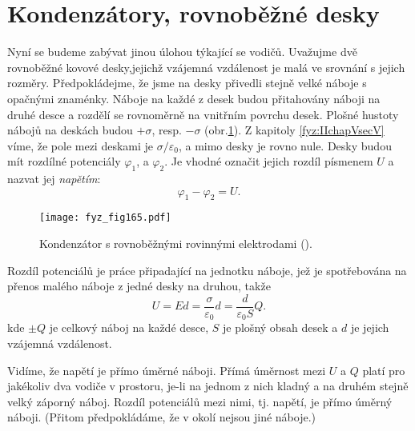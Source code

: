 {\section{Kondenzátory, rovnoběžné desky}\label{fyz:IIchapVsecXIX}
  Nyní se budeme zabývat jinou úlohou týkající se vodičů. Uvažujme dvě rovnoběžné kovové 
  desky,jejichž vzájemná vzdálenost je malá ve srovnání s jejich rozměry. Předpokládejme, že jsme
  na desky přivedli stejně velké náboje s opačnými znaménky. Náboje na každé z desek budou 
  přitahovány náboji na druhé desce a rozdělí se rovnoměrně na vnitřním povrchu desek. Plošné
  hustoty nábojů na deskách budou \(+\sigma\), resp. \(-\sigma\) (obr.\ref{fyz:fig165}). Z kapitoly 
  \ref{fyz:IIchapVsecV} víme, že pole mezi deskami je \(\sigma/\varepsilon_0\), a mimo desky je 
  rovno nule. Desky budou mít rozdílné potenciály \(\varphi_1\), a \(\varphi_2\). Je vhodné označit 
  jejich rozdíl písmenem \(U\) a nazvat jej \emph{napětím}:
  \begin{equation}\label{fyz:eq292}
    \varphi_1 - \varphi_2 = U.
  \end{equation}
  
  \begin{figure}[ht!]  %
    \centering
    \texttt{[image: fyz\_fig165.pdf]}
    \caption{Kondenzátor s rovnoběžnými rovinnými elektrodami 
             (\cite[s.~114]{Feynman02}).}
    \label{fyz:fig165}
  \end{figure}
  
  Rozdíl potenciálů je práce připadající na jednotku náboje, jež je spotřebována na přenos malého 
  náboje z jedné desky na druhou, takže
  \begin{equation}\label{fyz:eq293}
    U = Ed = \dfrac{\sigma}{\varepsilon_0}d = \dfrac{d}{\varepsilon_0S}Q.
  \end{equation}
  kde \(\pm Q\) je celkový náboj na každé desce, \(S\) je plošný obsah desek a \(d\) je jejich 
  vzájemná vzdálenost.
  
  Vidíme, že napětí je přímo úměrné náboji. Přímá úměrnost mezi \(U\) a \(Q\) platí pro jakékoliv 
  dva vodiče v prostoru, je-li na jednom z nich kladný a na druhém stejně velký záporný náboj. 
  Rozdíl potenciálů mezi nimi, tj. napětí, je přímo úměrný náboji. (Přitom předpokládáme, že v 
  okolí nejsou jiné náboje.)
  
}
